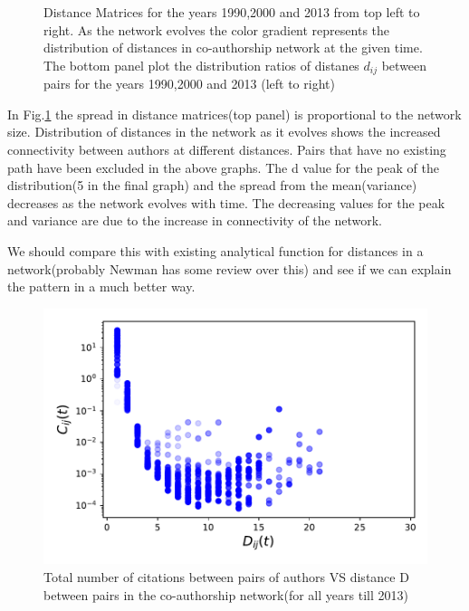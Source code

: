 \documentclass[aps, pre, twocolumn, nofootinbib]{revtex4-1}
\begin{document}
\begin{figure}[htbp]
  \captionsetup{singlelinecheck=false, justification=raggedright,  labelsep=space}
  \caption{Distance Matrices for the years 1990,2000 and 2013 from top left to right. As the network evolves the color gradient represents the distribution of distances in co-authorship network at the given time. The bottom panel plot the distribution ratios of distanes $d_{ij}$ between pairs for the years 1990,2000 and 2013 (left to right)}
  \label{f2}
\end{figure}
In Fig.\ref{f2} the spread in distance matrices(top panel) is proportional to the network size. Distribution of distances in the network as it  evolves shows the increased connectivity between authors at different distances. Pairs that have no existing path have been excluded in the above graphs. The d value for the peak of the distribution(5 in the final graph) and the spread from the mean(variance) decreases as the network evolves with time. The decreasing values for the peak and variance are due to the increase in connectivity of the network. 

{\color{blue}We should compare this with existing analytical function for distances in a network(probably Newman has some review over this) and see if we can explain the pattern in a much better way.}

\begin{figure}
	\centering
	
	\includegraphics[scale = 0.55]{plots/fig1}
	
\captionsetup{singlelinecheck=false, justification=raggedright,  labelsep=space}
\caption{Total number of citations between pairs of authors VS distance D between pairs in the co-authorship network(for all years till 2013)}
   \label{f3}
\end{figure}
\end{document}

